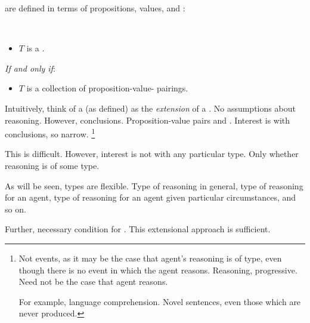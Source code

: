 \begin{note}
   are defined in terms of propositions, values, and :

  \begin{definition}[\tocN{2}]
    \label{def:tor}
    \mbox{ }
    \vspace{-\baselineskip}
    \begin{itemize}
    \item
      \(T\) is a \emph{}.
    \end{itemize}

    \emph{If and only if}:

    \begin{itemize}
    \item
      \(T\) is a collection of proposition-value-\pool{} pairings.
    \end{itemize}
    \vspace{-\baselineskip}
  \end{definition}

  Intuitively, think of a \tocN{} (as defined) as the \emph{extension} of a \tocN{}.
  No assumptions about reasoning.
  However, conclusions.
  Proposition-value pairs and .
  Interest is with conclusions, so narrow.%
  \footnote{
    Not events, as it may be the case that agent's reasoning is of type, even though there is no event in which the agent reasons.
    Reasoning, progressive.
    Need not be the case that agent reasons.

    For example, language comprehension.
    Novel sentences, even those which are never produced.
  }

  This is difficult.
  However, interest is not with any particular type.
  Only whether reasoning is of some type.

  As will be seen, types are flexible.
  Type of reasoning in general, type of reasoning for an agent, type of reasoning for an agent given particular circumstances, and so on.

  Further, necessary condition for \tC{}.
  This extensional approach is sufficient.
\end{note}

